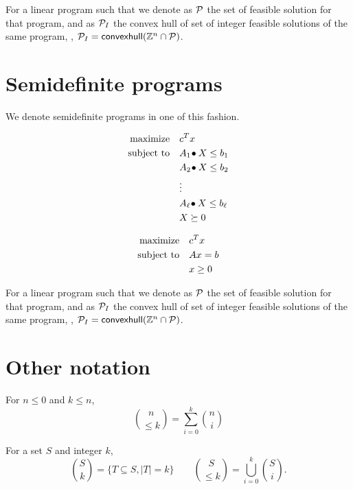 \documentclass[a4paper,justified]{tufte-handout}
\begin{document}
For a linear program such that we denote as $ \mathcal{P} $ the set of
feasible solution for that program, and as $ \mathcal{P}_{I} $ the convex
hull of set of integer feasible solutions of the same program, \ie, $
\mathcal{P}_{I} = \mathsf{convexhull}(\mathbb{Z}^{n} \cap \mathcal{P}) $.

\section{Semidefinite programs}

We denote semidefinite programs in one of this fashion.

\begin{figure}
\begin{minipage}[t]{0.5\textwidth}
\begin{alignat*}{2}
  \text{maximize}\hspace{1em}& c^{T}x\\
  \text{subject to}\hspace{1em}& {A_{1}}\!\bullet{X} \leq b_{1}\\
  & {A_{2}}\!\bullet{X} \leq b_{2}\\
  & \vdots \\
  & {A_{\ell}}\!\bullet{X} \leq b_{\ell}\\
  & X \succeq 0
\end{alignat*}
\end{minipage}
\begin{minipage}[t]{0.5\textwidth}
\begin{alignat*}{2}
  \text{maximize}\hspace{1em}& c^{T}x \\
  \text{subject to}\hspace{1em}& Ax = b\\
  & x \geq 0
\end{alignat*}
\end{minipage}
\end{figure}

For a linear program such that we denote as $ \mathcal{P} $ the set of
feasible solution for that program, and as $ \mathcal{P}_{I} $ the convex
hull of set of integer feasible solutions of the same program, \ie, $
\mathcal{P}_{I} = \mathsf{convexhull}(\mathbb{Z}^{n} \cap \mathcal{P}) $.


\section{Other notation}

For $ n\leq 0 $ and $ k\leq n $,
\begin{equation*}
  \binom{n}{\leq k} = \sum^{k}_{i=0}\binom{n}{i} 
\end{equation*}

For a set $ S $ and integer $k$,
\begin{equation*}
  \binom{S}{k}= \{ T \subseteq S, |T|=k  \} \qquad \binom{S}{\leq k} =
  \bigcup^{k}_{i=0} \binom{S}{i}.
\end{equation*}


% 
% 
\end{document}
